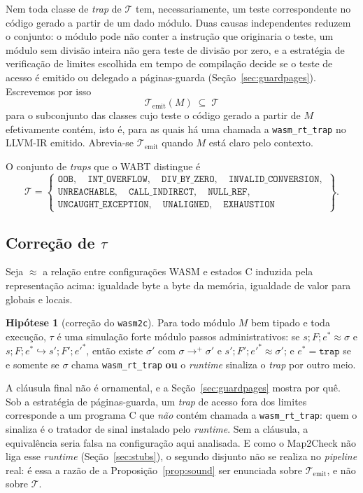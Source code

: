 \documentclass[11pt,a4paper]{article}
\theoremstyle{definition}
\newtheorem{hipotese}{Hipótese}
\newcommand{\code}[1]{\texttt{#1}}
\begin{document}
Nem toda classe de \emph{trap} de $\mathcal{T}$ tem, necessariamente, um teste
correspondente no código gerado a partir de um dado módulo. Duas causas
independentes reduzem o conjunto: o módulo pode não conter a instrução que
originaria o teste, um módulo sem divisão inteira não gera teste de divisão
por zero, e a estratégia de verificação de limites escolhida em tempo de
compilação decide se o teste de acesso é emitido ou delegado a páginas-guarda
(Seção~\ref{sec:guardpages}). Escrevemos por isso
\[
  \mathcal{T}_{\mathrm{emit}}(M) \;\subseteq\; \mathcal{T}
\]
para o subconjunto das classes cujo teste o código gerado a partir de $M$
efetivamente contém, isto é, para as quais há uma chamada a
\code{wasm\_rt\_trap} no LLVM-IR emitido. Abrevia-se
$\mathcal{T}_{\mathrm{emit}}$ quando $M$ está claro pelo contexto.

O conjunto de \emph{traps} que o WABT distingue é
\[
  \mathcal{T} =
  \left\{
  \begin{array}{l}
    \mathtt{OOB},\quad \mathtt{INT\_OVERFLOW},\quad \mathtt{DIV\_BY\_ZERO},\quad
    \mathtt{INVALID\_CONVERSION},\\[2pt]
    \mathtt{UNREACHABLE},\quad \mathtt{CALL\_INDIRECT},\quad \mathtt{NULL\_REF},\\[2pt]
    \mathtt{UNCAUGHT\_EXCEPTION},\quad \mathtt{UNALIGNED},\quad \mathtt{EXHAUSTION}
  \end{array}
  \right\} .
\]

\subsection{Correção de \texorpdfstring{$\tau$}{tau}}

Seja $\approx$ a relação entre configurações WASM e estados C induzida pela
representação acima: igualdade byte a byte da memória, igualdade de valor para
globais e locais.

\begin{hipotese}[correção do \code{wasm2c}]\label{hip:wasm2c}
Para todo módulo $M$ bem tipado e toda execução, $\tau$ é uma simulação forte
módulo passos administrativos: se $s;F;e^{*} \approx \sigma$ e
$s;F;e^{*} \hookrightarrow s';F';e'^{*}$, então existe $\sigma'$ com
$\sigma \to^{+} \sigma'$ e $s';F';e'^{*} \approx \sigma'$; e
$e^{*} = \mathtt{trap}$ se e somente se $\sigma$ chama \code{wasm\_rt\_trap}
\textbf{ou} o \emph{runtime} sinaliza o \emph{trap} por outro meio.
\end{hipotese}

A cláusula final não é ornamental, e a Seção~\ref{sec:guardpages} mostra por quê.
Sob a estratégia de páginas-guarda, um \emph{trap} de acesso fora dos limites
corresponde a um programa C que \emph{não} contém chamada a
\code{wasm\_rt\_trap}: quem o sinaliza é o tratador de sinal instalado pelo
\emph{runtime}. Sem a cláusula, a equivalência seria falsa na configuração aqui
analisada. E como o Map2Check não liga esse \emph{runtime}
(Seção~\ref{sec:stubs}), o segundo disjunto não se realiza no \emph{pipeline}
real: é essa a razão de a Proposição~\ref{prop:sound} ser enunciada sobre
$\mathcal{T}_{\mathrm{emit}}$, e não sobre $\mathcal{T}$.
\end{document}
